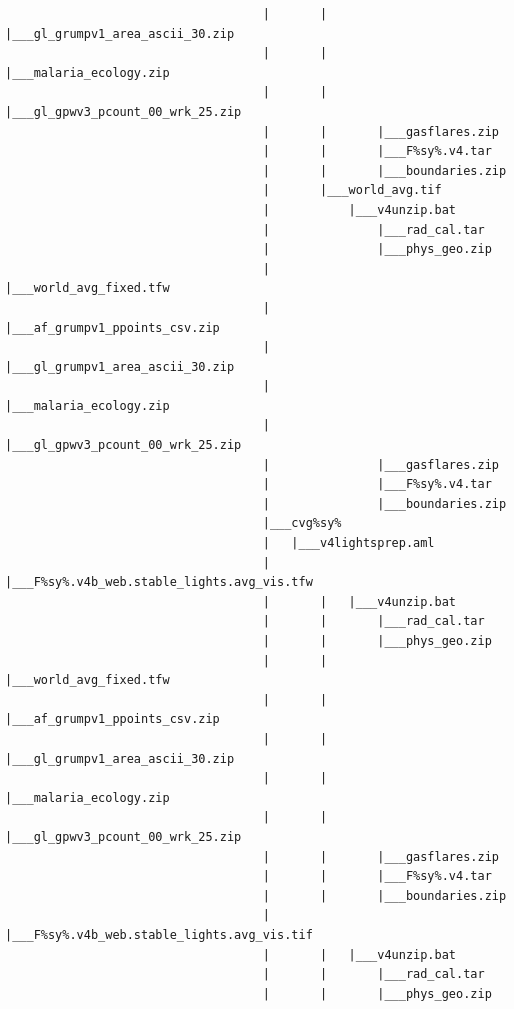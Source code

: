 \documentclass[]{book}
\begin{document}
\begin{verbatim}
                                    |       |       |___gl_grumpv1_area_ascii_30.zip
                                    |       |       |___malaria_ecology.zip
                                    |       |       |___gl_gpwv3_pcount_00_wrk_25.zip
                                    |       |       |___gasflares.zip
                                    |       |       |___F%sy%.v4.tar
                                    |       |       |___boundaries.zip
                                    |       |___world_avg.tif
                                    |           |___v4unzip.bat
                                    |               |___rad_cal.tar
                                    |               |___phys_geo.zip
                                    |               |___world_avg_fixed.tfw
                                    |               |___af_grumpv1_ppoints_csv.zip
                                    |               |___gl_grumpv1_area_ascii_30.zip
                                    |               |___malaria_ecology.zip
                                    |               |___gl_gpwv3_pcount_00_wrk_25.zip
                                    |               |___gasflares.zip
                                    |               |___F%sy%.v4.tar
                                    |               |___boundaries.zip
                                    |___cvg%sy%
                                    |   |___v4lightsprep.aml
                                    |       |___F%sy%.v4b_web.stable_lights.avg_vis.tfw
                                    |       |   |___v4unzip.bat
                                    |       |       |___rad_cal.tar
                                    |       |       |___phys_geo.zip
                                    |       |       |___world_avg_fixed.tfw
                                    |       |       |___af_grumpv1_ppoints_csv.zip
                                    |       |       |___gl_grumpv1_area_ascii_30.zip
                                    |       |       |___malaria_ecology.zip
                                    |       |       |___gl_gpwv3_pcount_00_wrk_25.zip
                                    |       |       |___gasflares.zip
                                    |       |       |___F%sy%.v4.tar
                                    |       |       |___boundaries.zip
                                    |       |___F%sy%.v4b_web.stable_lights.avg_vis.tif
                                    |       |   |___v4unzip.bat
                                    |       |       |___rad_cal.tar
                                    |       |       |___phys_geo.zip

\end{verbatim}
\end{document}
